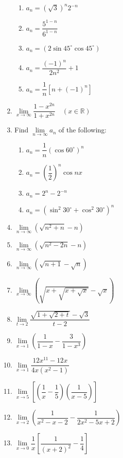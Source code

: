 \documentclass{report}
\begin{document}
\begin{multicols}{2}
\begin{enumerate}
\begin{enumerate}
                        \item $a_n = {(\sqrt{3})}^n2^{-n}$
                        \item $a_n = \dfrac{5^{1-n}}{6^{1-n}}$
                        \item $a_n = (2\sin45^\circ\cos45^\circ)$
                        \item $a_n = {\dfrac{{(-1)}^{n}}{2n^{2}}+1}$
                        \item $a_n = \dfrac{1}{n}\left[n+{(-1)}^n\right]$
                  \end{enumerate}
            \item $\lim\limits_{x\to\infty}{\dfrac{1-x^{2n}}{1+x^{2n}}} \quad (x \in \mathbb{R})$
            \item Find $\lim\limits_{n\to\infty}a_n$ of the following:
                  \begin{enumerate}
                        \item $a_n = \dfrac{1}{n}{(\cos60^\circ)}^{n}$
                        \item $a_n = {\left(\dfrac{1}{2}\right)}^n\cos nx$
                        \item $a_n = 2^n - 2^{-n}$
                        \item $a_n = {(\sin^2 30^\circ + \cos^2 30^\circ)}^n$
                  \end{enumerate}
            \item $\lim\limits_{n\to\infty}(\sqrt{n^2 + n} - n)$
            \item $\lim\limits_{n\to\infty}(\sqrt{n^2 - 2n} - n)$
            \item $\lim\limits_{n\to\infty}(\sqrt{n+1} - \sqrt{n})$
            \item $\lim\limits_{x\to\infty}(\sqrt{x+\sqrt{x+\sqrt{x}}} - \sqrt{x})$
            \item $\lim\limits_{t\to2}\dfrac{\sqrt{1+\sqrt{2+t}}-\sqrt{3}}{t-2}$
            \item $\lim\limits_{x\to1}\left(\dfrac{1}{1-x} - \dfrac{3}{1-x^3}\right)$
            \item $\lim\limits_{x\to1}{\dfrac{12x^{11}-12x}{4x(x^{2}-1)}}$
            \item $\lim\limits_{x\to5}\left[\left(\dfrac{1}{x}-\dfrac{1}{5}\right)\left(\dfrac{1}{x-5}\right)\right]$
            \item $\lim\limits_{x\to2}\left(\dfrac{1}{x^2-x-2} - \dfrac{1}{2x^2-5x+2}\right)$
            \item $\lim\limits_{x\to0}{\dfrac{1}{x}}\left[{\dfrac{1}{(x+2)^{2}}}-{\dfrac{1}{4}}\right]$

\end{enumerate}
\end{multicols}
\end{document}
